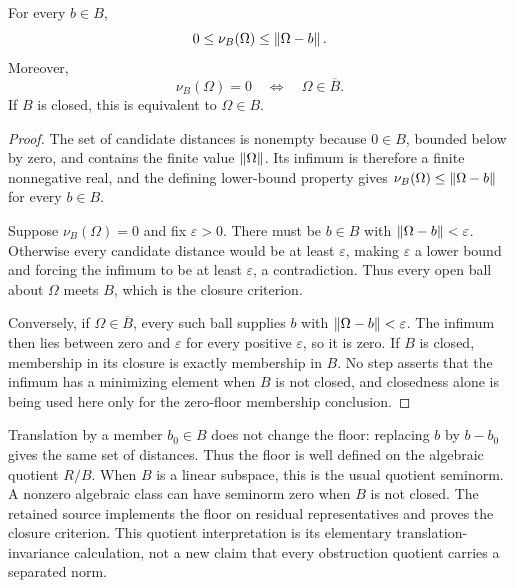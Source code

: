 \begin{KSproposition}\label{KS:KS76}
For every \(b\in B\),
\[
 0\le\nu_B(\Omega)\le\left\lVert\Omega-b\right\rVert.
\]
Moreover,
\[
 \nu_B(\Omega)=0\quad\Longleftrightarrow\quad\Omega\in\overline B.
\]
If \(B\) is closed, this is equivalent to \(\Omega\in B\).
\end{KSproposition}
\begin{proof}
The set of candidate distances is nonempty because \(0\in B\), bounded below by zero, and contains the finite value \(\left\lVert\Omega\right\rVert\). Its infimum is therefore a finite nonnegative real, and the defining lower-bound property gives \(\nu_B(\Omega)\le\left\lVert\Omega-b\right\rVert\) for every \(b\in B\).

Suppose \(\nu_B(\Omega)=0\) and fix \(\varepsilon>0\). There must be \(b\in B\) with \(\left\lVert\Omega-b\right\rVert<\varepsilon\). Otherwise every candidate distance would be at least \(\varepsilon\), making \(\varepsilon\) a lower bound and forcing the infimum to be at least \(\varepsilon\), a contradiction. Thus every open ball about \(\Omega\) meets \(B\), which is the closure criterion.

Conversely, if \(\Omega\in\overline B\), every such ball supplies \(b\) with \(\left\lVert\Omega-b\right\rVert<\varepsilon\). The infimum then lies between zero and \(\varepsilon\) for every positive \(\varepsilon\), so it is zero. If \(B\) is closed, membership in its closure is exactly membership in \(B\). No step asserts that the infimum has a minimizing element when \(B\) is not closed, and closedness alone is being used here only for the zero-floor membership conclusion.
\end{proof}
Translation by a member \(b_0\in B\) does not change the floor: replacing \(b\) by \(b-b_0\) gives the same set of distances. Thus the floor is well defined on the algebraic quotient \(R/B\). When \(B\) is a linear subspace, this is the usual quotient seminorm. A nonzero algebraic class can have seminorm zero when \(B\) is not closed. The retained source implements the floor on residual representatives and proves the closure criterion. This quotient interpretation is its elementary translation-invariance calculation, not a new claim that every obstruction quotient carries a separated norm.

